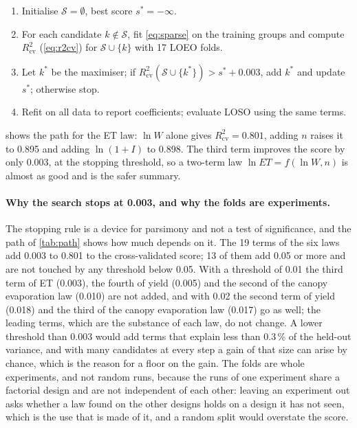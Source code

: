 \begin{enumerate}[nosep,label=\arabic*.]
\item Initialise $\mathcal S=\emptyset$, best score $s^\ast=-\infty$.
\item For each candidate $k\notin\mathcal S$, fit \cref{eq:sparse} on the training groups and compute $R^2_{\mathrm{cv}}$ (\cref{eq:r2cv}) for $\mathcal S\cup\{k\}$ with 17 LOEO folds.
\item Let $k^\ast$ be the maximiser; if $R^2_{\mathrm{cv}}(\mathcal S\cup\{k^\ast\})>s^\ast+0.003$, add $k^\ast$ and update $s^\ast$; otherwise stop.
\item Refit on all data to report coefficients; evaluate LOSO using the same terms.
\end{enumerate}
 shows the path for the ET law: $\ln W$ alone gives $R^2_{\mathrm{cv}}=0.801$, adding $n$ raises it to 0.895 and adding $\ln(1+I)$ to 0.898. The third term improves the score by only 0.003, at the stopping threshold, so a two-term law $\ln\mathit{ET}=f(\ln W,n)$ is almost as good and is the safer summary.

\paragraph{Why the search stops at 0.003, and why the folds are experiments.} The stopping rule is a device for parsimony and not a test of significance, and the path of \cref{tab:path} shows how much depends on it. The 19 terms of the six laws add 0.003 to 0.801 to the cross-validated score; 13 of them add 0.05 or more and are not touched by any threshold below 0.05. With a threshold of 0.01 the third term of ET (0.003), the fourth of yield (0.005) and the second of the canopy evaporation law (0.010) are not added, and with 0.02 the second term of yield (0.018) and the third of the canopy evaporation law (0.017) go as well; the leading terms, which are the substance of each law, do not change. A lower threshold than 0.003 would add terms that explain less than 0.3\,\% of the held-out variance, and with many candidates at every step a gain of that size can arise by chance, which is the reason for a floor on the gain. The folds are whole experiments, and not random runs, because the runs of one experiment share a factorial design and are not independent of each other: leaving an experiment out asks whether a law found on the other designs holds on a design it has not seen, which is the use that is made of it, and a random split would overstate the score.

